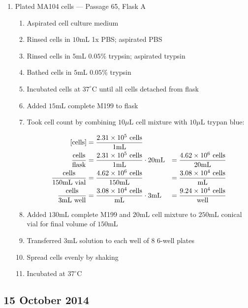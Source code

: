 \begin{enumerate}
	\item Plated MA104 cells --- Passage 65, Flask A
		\begin{enumerate}
			\item Aspirated cell culture medium
			\item Rinsed cells in $10$mL 1x PBS; aspirated PBS
			\item Rinsed cells in $5$mL $0.05$\% trypsin; aspirated trypsin
			\item Bathed cells in $5$mL $0.05$\% trypsin
			\item Incubated cells at $37^{\circ}$C until all cells detached from flask
			\item Added $15$mL complete M199 to flask
			\item Took cell count by combining $10\mu$L cell mixture with $10\mu$L trypan blue:
			
				\begin{align*}
				\text{[cells]} &= \frac{2.31\times 10^{5}\text{ cells}}{1\text{mL}} \\
				\frac{\text{cells}}{\text{flask}} &= \frac{2.31\times 10^{5}\text{ cells}}{1\text{mL}} \cdot 20\text{mL} &= \frac{4.62\times 10^{6}\text{ cells}}{20\text{mL}}\\
				\frac{\text{cells}}{150\text{mL vial}} &= \frac{4.62\times 10^{6}\text{ cells}}{150\text{mL}} &= \frac{3.08\times 10^{4}\text{ cells}}{\text{mL}}\\
				\frac{\text{cells}}{3\text{mL well}} &= \frac{3.08\times 10^{4}\text{ cells}}{\text{mL}} \cdot 3\text{mL} &= \frac{9.24\times 10^{4}\text{ cells}}{\text{well}}\\
				\end{align*}
			\item Added $130$mL complete M199 and $20$mL cell mixture to $250$mL conical vial for final volume of $150$mL
			\item Transferred $3$mL solution to each well of 8 6-well plates
			\item Spread cells evenly by shaking
			\item Incubated at $37^{\circ}$C
		\end{enumerate}
\end{enumerate}

% 

\subsection*{15 October 2014}

